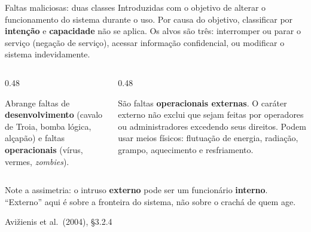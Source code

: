 \documentclass{beamer}
\newcommand{\sect}[1]{\par\smallskip\hfill{\tiny\color{black!55}Avi\v{z}ienis et al.\ (2004), #1}}
\begin{document}
\begin{frame}{Faltas maliciosas: duas classes}
    \footnotesize
    Introduzidas com o objetivo de alterar o funcionamento do sistema durante o uso. Por causa do objetivo, classificar por \textbf{inten\c{c}\~ao} e \textbf{capacidade} n\~ao se aplica.
    \medskip
    Os alvos s\~ao tr\^es: interromper ou parar o servi\c{c}o (nega\c{c}\~ao de servi\c{c}o), acessar informa\c{c}\~ao confidencial, ou modificar o sistema indevidamente.
    \medskip
    \begin{columns}[T]
        \begin{column}{0.48\textwidth}
            \begin{tcolorbox}[colback=depVermelho!5,colframe=depVermelho!70,boxrule=0.6pt,title={\scriptsize\bfseries 1. L\'ogica maliciosa}]
                \scriptsize
                Abrange faltas de \textbf{desenvolvimento} (cavalo de Troia, bomba l\'ogica, alçapão) e faltas \textbf{operacionais} (v\'irus, vermes, \textit{zombies}).
            \end{tcolorbox}
        \end{column}
        \begin{column}{0.48\textwidth}
            \begin{tcolorbox}[colback=depVermelho!5,colframe=depVermelho!70,boxrule=0.6pt,title={\scriptsize\bfseries 2. Tentativas de intrus\~ao}]
                \scriptsize
                S\~ao faltas \textbf{operacionais externas}. O car\'ater externo n\~ao exclui que sejam feitas por operadores ou administradores excedendo seus direitos. Podem usar meios f\'isicos: flutua\c{c}\~ao de energia, radia\c{c}\~ao, grampo, aquecimento e resfriamento.
            \end{tcolorbox}
        \end{column}
    \end{columns}
    \medskip
    \begin{ancora}
        \footnotesize
        Note a assimetria: o intruso \textbf{externo} pode ser um funcion\'ario \textbf{interno}. ``Externo'' aqui \'e sobre a fronteira do sistema, n\~ao sobre o crach\'a de quem age.
    \end{ancora}
    \sect{\S3.2.4}
\end{frame}
\end{document}
